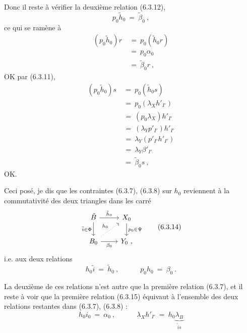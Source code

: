 \documentclass[11pt]{article}
\newcommand{\msp}[1]{\marginpar{\footnotesize [#1]}}
\begin{document}
Donc il reste à vérifier la deuxième relation (6.3.12),
\[
p_0\tilde{h}_0 \ =\ \tilde{\beta}_0\ ,
\]
ce qui se ramène à
\[
\begin{aligned}
(p_0\tilde{h}_0)r \ &=\ p_0(\tilde{h}_0r) \\
&=\ p_0\alpha_0 \\
&=\ \tilde{\beta}_0r\ ,
\end{aligned}
\]
OK par (6.3.11),
\[
\begin{aligned}
(p_0\tilde{h}_0)s \ &=\ p_0(\tilde{h}_0s) \\
&=\ p_0(\lambda_X h'_{I'}) \\
&=\ (p_0\lambda_X)h'_{I'} \\
&=\ (\lambda_Y p'_{I'})h'_{I'} \\
&=\ \lambda_Y(p'_{I'}h'_{I'}) \\
&=\ \lambda_Y\beta'_{I'} \\
&=\ \tilde{\beta}_0s\ ,
\end{aligned}
\]
OK.

Ceci posé, je dis que les contraintes (6.3.7), (6.3.8) sur $h_0$ reviennent à la commutativité des deux triangles dans les carré %
\[
\begin{tikzcd}
\tilde{B} \arrow[r, "\tilde{h}_0"] \arrow[d, "\tilde{i}\in\Phi"'] & X_0 \arrow[d, "p_0\in\Psi"] \\
B_0 \arrow[r, "\beta_0"'] \arrow[ur, dotted, "h_0"] & Y_0\ ,
\end{tikzcd}
\tag*{(6.3.14)}
\]
\msp{page 116}i.e. aux deux relations
\[
h_0\tilde{i} \ =\ \tilde{h}_0\ , \qquad\quad p_0h_0 \ =\ \beta_0\ .
\tag*{(6.3.15)}
\]

La deuxième de ces relations n'est autre que la première relation (6.3.7), et il reste à voir que la première relation (6.3.15) équivaut à l'ensemble des deux relations restantes dans (6.3.7), (6.3.8) :
\[
h_0i_0 \ =\ \alpha_0\ , \qquad\quad \lambda_X h'_{I'} \ =\ h_0\underbrace{\lambda_B}_{\tilde{i}s}
\tag*{(6.3.16)}
\]
\end{document}
